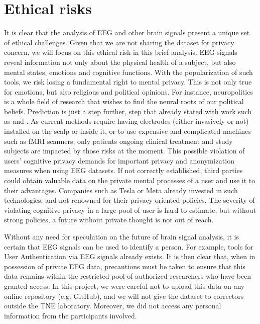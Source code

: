 \documentclass[10pt,conference,compsocconf]{IEEEtran}
\begin{document}
\newpage
\section{Ethical risks}
It is clear that the analysis of EEG and other brain signals present a unique set of ethical challenges. Given that we are not sharing the dataset for privacy concern, we will focus on this ethical risk in this brief analysis. EEG signals reveal information not only about the physical health of a subject, but also mental states, emotions and cognitive functions. With the popularization of such tools, we risk losing a fundamental right to mental privacy. This is not only true for emotions, but also religious and political opinions. For instance, neuropolitics\cite{neuropolitics} is a whole field of research that wishes to find the neural roots of our political beliefs. Prediction is just a step further, step that already stated with work such as \cite{galli_early_2021} and \cite{yun_erp_2022}. As current methods require having electrodes (either invasively or not) installed on the scalp or inside it, or to use expensive and complicated machines such as fMRI scanners, only patients ongoing clinical treatment and study subjects are impacted by those risks at the moment. This possible violation of users' cognitive privacy demands for important privacy and anonymization measures when using EEG datasets. If not correctly established, third parties could obtain valuable data on the private mental processes of a user and use it to their advantages. Companies such as Tesla or Meta already invested in such technologies, and not renowned for their privacy-oriented policies. The severity of violating cognitive privacy in a large pool of user is hard to estimate, but without strong policies, a future without private thought is not out of reach.

Without any need for speculation on the future of brain signal analysis, it is certain that EEG signals can be used to identify a person. For example, tools for User Authentication via EEG signals already exists\cite{10058960}. It is then clear that, when in possession of private EEG data, precautions must be taken to ensure that this data remains within the restricted pool of authorized researchers who have been granted access. In this project, we were careful not to upload this data on any online repository (e.g. GitHub), and we will not give the dataset to correctors outside the TNE laboratory. Moreover, we did not access any personal information from the participants involved.
\end{document}

